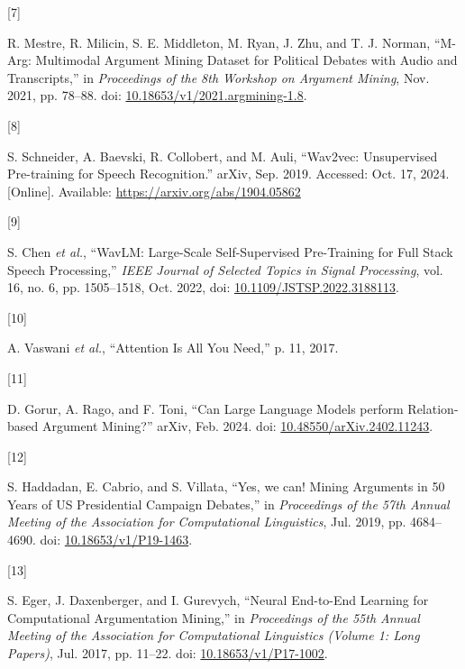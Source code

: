 \documentclass[twocolumn,twoside]{article}
\newlength{\cslhangindent}
\newlength{\csllabelwidth}
\newenvironment{CSLReferences}[2] %
 {\begin{list}{}{%
  \setlength{\itemindent}{0pt}
  \setlength{\leftmargin}{0pt}
  \setlength{\parsep}{0pt}
  \ifodd #1
   \setlength{\leftmargin}{\cslhangindent}
   \setlength{\itemindent}{-1\cslhangindent}
  \fi
  \setlength{\itemsep}{#2\baselineskip}}}
 {\end{list}}
\newcommand{\CSLLeftMargin}[1]{\parbox[t]{\csllabelwidth}{\strut#1\strut}}
\newcommand{\CSLRightInline}[1]{\parbox[t]{\linewidth - \csllabelwidth}{\strut#1\strut}}
\begin{document}
\begin{CSLReferences}{0}{0}
\CSLLeftMargin{{[}7{]} }%
\CSLRightInline{R. Mestre, R. Milicin, S. E. Middleton, M. Ryan, J. Zhu,
and T. J. Norman, {``M-{Arg}: {Multimodal Argument Mining Dataset} for
{Political Debates} with {Audio} and {Transcripts},''} in
\emph{Proceedings of the 8th {Workshop} on {Argument Mining}}, Nov.
2021, pp. 78--88. doi:
\href{https://doi.org/10.18653/v1/2021.argmining-1.8}{10.18653/v1/2021.argmining-1.8}.}

\CSLLeftMargin{{[}8{]} }%
\CSLRightInline{S. Schneider, A. Baevski, R. Collobert, and M. Auli,
{``Wav2vec: {Unsupervised Pre-training} for {Speech Recognition}.''}
arXiv, Sep. 2019. Accessed: Oct. 17, 2024. {[}Online{]}. Available:
\url{https://arxiv.org/abs/1904.05862}}

\CSLLeftMargin{{[}9{]} }%
\CSLRightInline{S. Chen \emph{et al.}, {``{WavLM}: {Large-Scale
Self-Supervised Pre-Training} for {Full Stack Speech Processing},''}
\emph{IEEE Journal of Selected Topics in Signal Processing}, vol. 16,
no. 6, pp. 1505--1518, Oct. 2022, doi:
\href{https://doi.org/10.1109/JSTSP.2022.3188113}{10.1109/JSTSP.2022.3188113}.}

\CSLLeftMargin{{[}10{]} }%
\CSLRightInline{A. Vaswani \emph{et al.}, {``Attention {Is All You
Need},''} p. 11, 2017.}

\CSLLeftMargin{{[}11{]} }%
\CSLRightInline{D. Gorur, A. Rago, and F. Toni, {``Can {Large Language
Models} perform {Relation-based Argument Mining}?''} arXiv, Feb. 2024.
doi:
\href{https://doi.org/10.48550/arXiv.2402.11243}{10.48550/arXiv.2402.11243}.}

\CSLLeftMargin{{[}12{]} }%
\CSLRightInline{S. Haddadan, E. Cabrio, and S. Villata, {``Yes, we can!
{Mining Arguments} in 50 {Years} of {US Presidential Campaign
Debates},''} in \emph{Proceedings of the 57th {Annual Meeting} of the
{Association} for {Computational Linguistics}}, Jul. 2019, pp.
4684--4690. doi:
\href{https://doi.org/10.18653/v1/P19-1463}{10.18653/v1/P19-1463}.}

\CSLLeftMargin{{[}13{]} }%
\CSLRightInline{S. Eger, J. Daxenberger, and I. Gurevych, {``Neural
{End-to-End Learning} for {Computational Argumentation Mining},''} in
\emph{Proceedings of the 55th {Annual Meeting} of the {Association} for
{Computational Linguistics} ({Volume} 1: {Long Papers})}, Jul. 2017, pp.
11--22. doi:
\href{https://doi.org/10.18653/v1/P17-1002}{10.18653/v1/P17-1002}.}


\end{CSLReferences}
\end{document}
